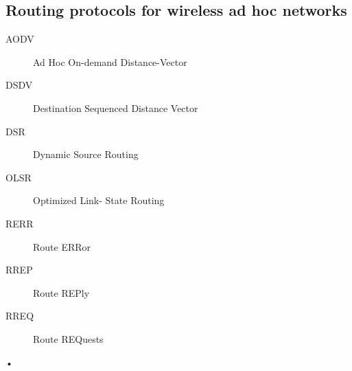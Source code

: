\documentclass[twocolumn]{article}
\begin{document}
\subsection{Routing protocols for wireless ad hoc networks}
\begin{description}
\item[AODV]Ad Hoc On-demand Distance-Vector
\item[DSDV]Destination Sequenced Distance Vector
\item[DSR]Dynamic Source Routing
\item[OLSR]Optimized Link- State Routing
\item[RERR]Route ERRor
\item[RREP]Route REPly
\item[RREQ]Route REQuests
\end{description}•
\end{document}
